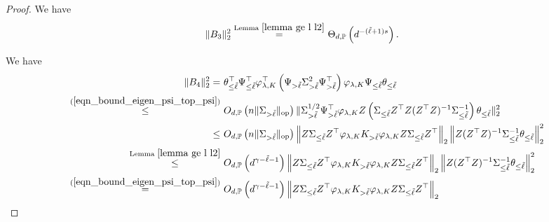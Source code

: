 \documentclass{article}
\theoremstyle{plain}
\theoremstyle{definition}
\theoremstyle{remark}
\begin{document}
\begin{appendix}
\begin{proof}
We have
\begin{equation}\label{eqn_bound_B_3_spe}
    \begin{aligned}
                \|B_3\|_{2}^{2} 
        \overset{\text{Lemma } \ref{lemma ge l l2}}{=}&~
        \Theta_{d, \mathbb{P}} \left( d^{-(\tilde{\ell}+1)s}\right).
    \end{aligned}
\end{equation}



We have
\begin{equation*}
    \begin{aligned}
   \|B_4\|_{2}^{2} = &~   
  \theta_{\leq \tilde{\ell}}^{\top} \Psi_{\leq \tilde{\ell}}^{\top} \varphi_{\lambda, K}^{\top}\left(\Psi_{>\tilde{\ell}} \Sigma_{>\tilde{\ell}}^2 \Psi_{>\tilde{\ell}}^{\top}\right) \varphi_{\lambda, K} \Psi_{\leq \tilde{\ell}} \theta_{\leq \tilde{\ell}}
  \\
                \overset{(\ref{eqn_bound_eigen_psi_top_psi})}{\leq} &~
        O_{d, \mathbb{P}} \left( n\|\Sigma_{> \tilde{\ell}}\|_{\mathrm{op}} \right)
        \|\Sigma_{>\tilde{\ell}}^{1/2} \Psi^{\top}_{>\tilde{\ell}} \varphi_{\lambda, K} Z \left(\Sigma_{\leq \tilde{\ell}} Z^{\top} Z (Z^{\top} 
                Z)^{-1} \Sigma_{\leq \tilde{\ell}}^{-1}\right) \theta_{\leq \tilde{\ell}}\|_{2}^{2}
        \\
        \leq &~
        O_{d, \mathbb{P}} \left( n\|\Sigma_{> \tilde{\ell}}\|_{\mathrm{op}} \right)  
        \left\| Z\Sigma_{\leq \tilde{\ell}} Z^{\top} \varphi_{\lambda, K} K_{> \tilde{\ell}}  \varphi_{\lambda, K} Z \Sigma_{\leq \tilde{\ell}} Z^{\top}\right\|_{2} 
        \left\| Z (Z^{\top} 
                Z)^{-1} \Sigma_{\leq \tilde{\ell}}^{-1} \theta_{\leq \tilde{\ell}}  \right\|_{2}^{2}\\
       \overset{\text{Lemma } \ref{lemma ge l l2}}{\leq} &~
        O_{d, \mathbb{P}} \left( d^{\gamma-\tilde{\ell}-1} \right)  
        \left\| Z\Sigma_{\leq \tilde{\ell}} Z^{\top} \varphi_{\lambda, K} K_{> \tilde{\ell}}  \varphi_{\lambda, K} Z \Sigma_{\leq \tilde{\ell}} Z^{\top}\right\|_{2} 
        \left\| Z (Z^{\top} 
                Z)^{-1} \Sigma_{\leq \tilde{\ell}}^{-1} \theta_{\leq \tilde{\ell}}  \right\|_{2}^{2}\\
        \overset{(\ref{eqn_bound_eigen_psi_top_psi})}{=}&~
        O_{d, \mathbb{P}} \left( d^{\gamma-\tilde{\ell}-1} \right)  
        \left\| Z\Sigma_{\leq \tilde{\ell}} Z^{\top} \varphi_{\lambda, K} K_{> \tilde{\ell}}  \varphi_{\lambda, K} Z \Sigma_{\leq \tilde{\ell}} Z^{\top}\right\|_{2} 

\end{aligned}
\end{equation*}
\end{proof}
\end{appendix}
\end{document}
